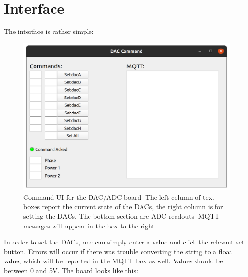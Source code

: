 \documentclass[11pt, letterpaper]{article}
\begin{document}
\section{Interface}
The interface is rather simple:
\begin{figure}[H]
    \centering
    \includegraphics[width=16cm]{command_ui.png}
    \caption{ Command UI for the DAC/ADC board. The left column of text boxes report the current state of the DACs, the right column is for setting the DACs. The bottom section are ADC readouts. MQTT messages will appear in the box to the right.  }
    \label{fig:command_ui}
\end{figure}

In order to set the DACs, one can simply enter a value and click the relevant set button. Errors will occur if there was trouble converting the string to a float value, which will be reported in the MQTT box as well. Values should be between 0 and 5V. The board looks like this:
\end{document}
